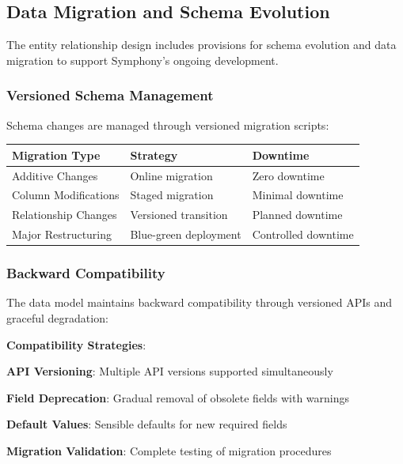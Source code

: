 \subsection*{Data Migration and Schema Evolution}

The entity relationship design includes provisions for schema evolution and data migration to support Symphony's ongoing development.

\subsubsection*{Versioned Schema Management}

Schema changes are managed through versioned migration scripts:

\begin{center}
\begin{tabular}{@{}lll@{}}
\toprule
\textbf{Migration Type} & \textbf{Strategy} & \textbf{Downtime} \\
\midrule
Additive Changes & Online migration & Zero downtime \\
Column Modifications & Staged migration & Minimal downtime \\
Relationship Changes & Versioned transition & Planned downtime \\
Major Restructuring & Blue-green deployment & Controlled downtime \\
\bottomrule
\end{tabular}
\end{center}

\subsubsection*{Backward Compatibility}

The data model maintains backward compatibility through versioned APIs and graceful degradation:

\begin{successbox}
\textbf{Compatibility Strategies}:
\begin{compactlist}
    \item \textbf{API Versioning}: Multiple API versions supported simultaneously
    \item \textbf{Field Deprecation}: Gradual removal of obsolete fields with warnings
    \item \textbf{Default Values}: Sensible defaults for new required fields
    \item \textbf{Migration Validation}: Complete testing of migration procedures
\end{compactlist}
\end{successbox}

